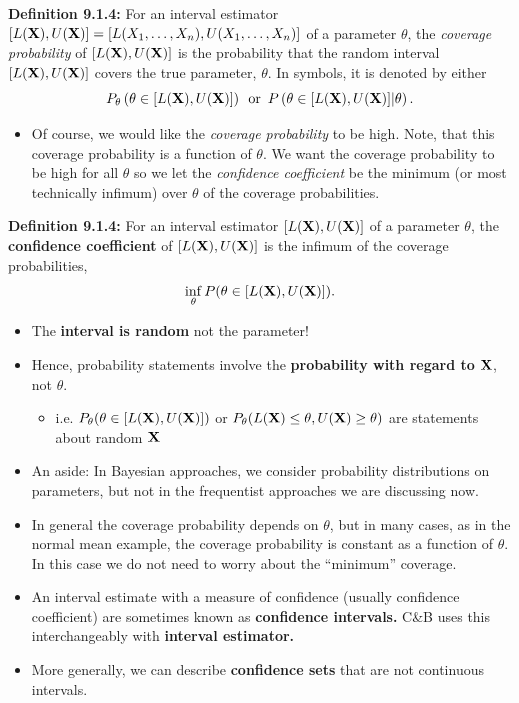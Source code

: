 \documentclass[11pt,]{article}
\providecommand{\tightlist}{%
  \setlength{\itemsep}{0pt}\setlength{\parskip}{0pt}}
\newcommand{\Xndots}{X_1, \ldots, X_n}
\newcommand{\LUX}{[L(\bX),U(\bX)]}
\def\bX{{\bf X}}
\begin{document}
\textbf{Definition 9.1.4:} For an interval estimator
\(\LUX = [L(\Xndots),U(\Xndots)]\) of a parameter \(\theta\), the
\emph{coverage probability} of \(\LUX\) is the probability that the
random interval \(\LUX\) covers the true parameter, \(\theta\). In
symbols, it is denoted by either
\[P_\theta\left(\theta \in \LUX\right)\, \mbox{ or } \, P\left(\theta \in \LUX | \theta\right).\]

\begin{itemize}
\tightlist
\item
  Of course, we would like the \emph{coverage probability} to be high.
  Note, that this coverage probability is a function of \(\theta\). We
  want the coverage probability to be high for all \(\theta\) so we let
  the \emph{confidence coefficient} be the minimum (or most technically
  infimum) over \(\theta\) of the coverage probabilities.
\end{itemize}

\textbf{Definition 9.1.4:} For an interval estimator \(\LUX\) of a
parameter \(\theta\), the \textbf{confidence coefficient} of \(\LUX\) is
the infimum of the coverage probabilities,
\[\inf_\theta P(\theta \in \LUX).\]

\begin{itemize}
\tightlist
\item
  The \textbf{interval is random} not the parameter!
\item
  Hence, probability statements involve the \textbf{probability with
  regard to} \(\bX\), not \(\theta\).

  \begin{itemize}
  \tightlist
  \item
    i.e. \(P_\theta(\theta \in \LUX)\) or
    \(P_\theta(L(\bX) \leq \theta, U(\bX) \geq \theta)\) are statements
    about random \(\bX\)
  \end{itemize}
\item
  An aside: In Bayesian approaches, we consider probability
  distributions on parameters, but not in the frequentist approaches we
  are discussing now.
\item
  In general the coverage probability depends on \(\theta\), but in many
  cases, as in the normal mean example, the coverage probability is
  constant as a function of \(\theta\). In this case we do not need to
  worry about the ``minimum'' coverage.
\item
  An interval estimate with a measure of confidence (usually confidence
  coefficient) are sometimes known as \textbf{confidence intervals.}
  C\&B uses this interchangeably with \textbf{interval estimator.}
\item
  More generally, we can describe \textbf{confidence sets} that are not
  continuous intervals.
\end{itemize}
\end{document}
